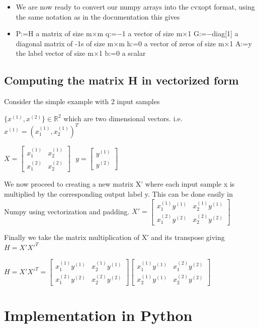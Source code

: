 \documentclass[12pt]{article}
\begin{document}
\begin{itemize}
\item We are now ready to convert our numpy arrays into the cvxopt format, using the same notation as in the documentation this gives

\item P:=H a matrix of size m×m
q:=−1⃗  a vector of size m×1
G:=−diag[1] a diagonal matrix of -1s of size m×m
h:=0⃗  a vector of zeros of size m×1
A:=y the label vector of size m×1
b:=0 a scalar
\end{itemize}

\subsection{Computing the matrix H in vectorized form}

Consider the simple example with 2 input samples 

$\{x^{(1)}, x^{(2)}\} \in \mathbb{R}^2$
which are two dimensional vectors. i.e.
$ x^{(1)} = (x_1^{(1)} , x_2^{(1)})^T$

$X = \begin{bmatrix} x_1^{(1)} & x_2^{(1)} \\ x_1^{(2)} & x_2^{(2)} \end{bmatrix} \ \ \ y = \begin{bmatrix} y^{(1)}  \\ y^{(2)} \end{bmatrix}$

We now proceed to creating a new matrix X' where each input sample x is multiplied by the corresponding output label y. This can be done easily in Numpy using vectorization and padding.
$X' = \begin{bmatrix} x^{(1)}_1 y^{(1)} & x^{(1)}_2y^{(1)} \\
x^{(2)}_1y^{(2)} & x^{(2)}_2y^{(2)} \end{bmatrix}$

Finally we take the matrix multiplication of X′ and its transpose giving
$H = X'  X'^T$

$H = X'  X'^T = \begin{bmatrix} x^{(1)}_1 y^{(1)} & x^{(1)}_2y^{(1)} \\
x^{(2)}_1y^{(2)} & x^{(2)}_2y^{(2)} \end{bmatrix} \begin{bmatrix} x^{(1)}_1 y^{(1)} & x^{(2)}_1 y^{(2)}  \\
x^{(1)}_2y^{(1)} & x^{(2)}_2y^{(2)} \end{bmatrix}$


\section{Implementation in Python}
\end{document}
